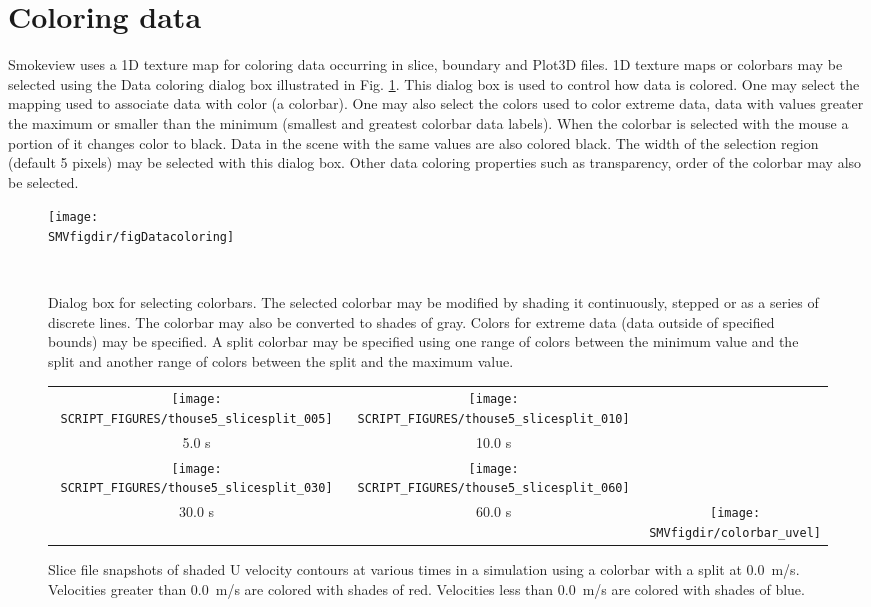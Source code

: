\documentclass[11pt,twoside]{book}
\newcommand{\figheightAbar}{2.2in}
\begin{document}
\section{Coloring data}Smokeview uses a 1D texture map for coloring data occurring in
slice, boundary and Plot3D files. 1D texture maps or colorbars may
be selected using the Data coloring dialog box illustrated in Fig. \ref{figDatacoloring}.
This dialog box is used to control how data is colored.
One may select the mapping used to associate data with color (a colorbar).
One may also select the colors used to color extreme data, data with values greater
the maximum or smaller than the minimum (smallest and greatest colorbar data labels).
When the colorbar is selected with the mouse a portion of it changes color to black.
Data in the scene with the same values are also colored black.
The width of the selection region (default 5 pixels) may be selected with this dialog box.
Other data coloring properties such as transparency, order of the colorbar may also be selected.

\begin{figure}[bph]
\centerline{\texttt{[image: \\SMVfigdir/figDatacoloring]}
}\ \caption [Dialog box for selecting colorbars.] {Dialog
box for selecting colorbars.  The selected colorbar may be modified by
shading it continuously, stepped or as a series of discrete lines.  The
colorbar may also be converted to shades of gray.  Colors for
extreme data (data outside of specified bounds) may be specified.
A split colorbar may be specified using one range of colors between the minimum
value and the split and another range of colors between the split and the maximum value.}
\label{figDatacoloring}
\end{figure}

\begin{figure}[bph]
\begin{center}
\begin{tabular}{ccc}
\texttt{[image: SCRIPT\_FIGURES/thouse5\_slicesplit\_005]}&
\texttt{[image: SCRIPT\_FIGURES/thouse5\_slicesplit\_010]}\\
5.0 s&10.0 s\\
\texttt{[image: SCRIPT\_FIGURES/thouse5\_slicesplit\_030]}&
\texttt{[image: SCRIPT\_FIGURES/thouse5\_slicesplit\_060]}&\\
30.0 s&60.0 s
&\raisebox{0.0ex}[0pt]{\texttt{[image: \\SMVfigdir/colorbar\_uvel]}}\\
\end{tabular}
\caption [Slice file snapshots of shaded U velocity contours using a colorbar with a split at 0.0~m/s.]
{Slice file snapshots of shaded U velocity contours at various
times in a simulation using a colorbar with a split at 0.0~m/s. Velocities greater than 0.0~m/s are colored with shades of red.
Velocities less than 0.0~m/s are colored with shades of blue. }
\label{figslicesplit}%
\end{center}
\end{figure}
\end{document}

